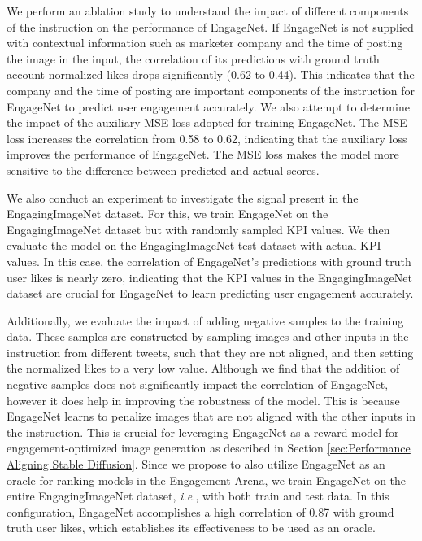  
We perform an ablation study to understand the impact of different components of the instruction on the performance of EngageNet. If EngageNet is not supplied with contextual information such as marketer company and the time of posting the image in the input, the correlation of its predictions with ground truth account normalized likes drops significantly (0.62 to 0.44). This indicates that the company and the time of posting are important components of the instruction for EngageNet to predict user engagement accurately.  We also attempt to determine the impact of the auxiliary MSE loss adopted for training EngageNet. The MSE loss increases the correlation from 0.58 to 0.62, indicating that the auxiliary loss improves the performance of EngageNet. The MSE loss makes the model more sensitive to the difference between predicted and actual scores. 

 
We also conduct an experiment to investigate the signal present in the EngagingImageNet dataset. For this, we train EngageNet on the EngagingImageNet dataset but with randomly sampled KPI values. We then evaluate the model on the EngagingImageNet test dataset with actual KPI values. In this case, the correlation of EngageNet's predictions with ground truth user likes is nearly zero, indicating that the KPI values in the EngagingImageNet dataset are crucial for EngageNet to learn predicting user engagement accurately. 
 
 
Additionally, we evaluate the impact of adding negative samples to the training data. These samples are constructed by sampling images and other inputs in the instruction from different tweets, such that they are not aligned, and then setting the normalized likes to a very low value. Although we find that the addition of negative samples does not significantly impact the correlation of EngageNet, however it does help in improving the robustness of the model. This is because EngageNet learns to penalize images that are not aligned with the other inputs in the instruction. This is crucial for leveraging EngageNet as a reward model for engagement-optimized image generation as described in Section \ref{sec:Performance Aligning Stable Diffusion}. Since we propose to also utilize EngageNet as an oracle for ranking models in the Engagement Arena, we train EngageNet on the entire EngagingImageNet dataset, \textit{i.e.}, with both train and test data. In this configuration, EngageNet accomplishes a high correlation of 0.87 with ground truth user likes, which establishes its effectiveness to be used as an oracle. 
 

